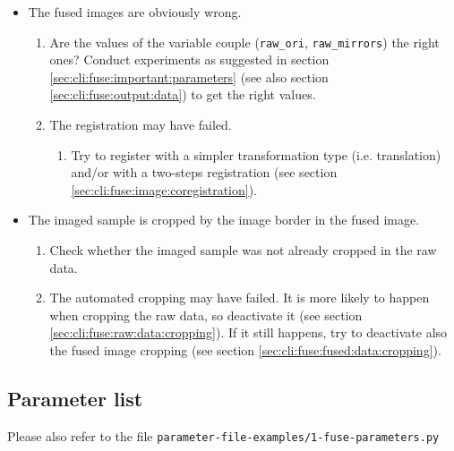 \begin{itemize}

\item The fused images are obviously wrong.
  \begin{enumerate}
  \item Are the values of the variable couple (\texttt{raw\_ori}, \texttt{raw\_mirrors}) the right ones? Conduct experiments as suggested in section \ref{sec:cli:fuse:important:parameters}  (see also section \ref{sec:cli:fuse:output:data}) to get the right values.
  \item The registration may have failed.
    \begin{enumerate}
    \item Try to register with a simpler transformation type (i.e. translation) and/or with a two-steps registration (see section \ref{sec:cli:fuse:image:coregistration}).
    \end{enumerate}
  \end{enumerate}
\item The imaged sample is cropped by the image border in the fused image.
  \begin{enumerate}
  \item Check whether the imaged sample was not already cropped in the raw data.
  \item The automated cropping may have failed. It is more likely to happen when cropping the raw data, so deactivate it (see section \ref{sec:cli:fuse:raw:data:cropping}). If it still happens, try to deactivate also the fused image cropping   (see section \ref{sec:cli:fuse:fused:data:cropping}).
  \end{enumerate}
\end{itemize}

\subsection{Parameter list}

Please also refer to the file
\texttt{parameter-file-examples/1-fuse-parameters.py}


